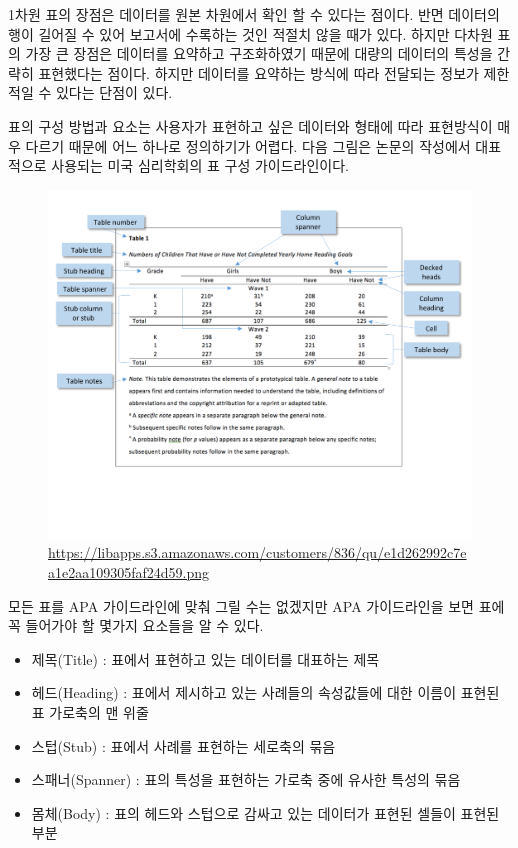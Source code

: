 \documentclass[
]{article}
\begin{document}
1차원 표의 장점은 데이터를 원본 차원에서 확인 할 수 있다는 점이다. 반면
데이터의 행이 길어질 수 있어 보고서에 수록하는 것인 적절치 않을 때가
있다. 하지만 다차원 표의 가장 큰 장점은 데이터를 요약하고 구조화하였기
때문에 대량의 데이터의 특성을 간략히 표현했다는 점이다. 하지만 데이터를
요약하는 방식에 따라 전달되는 정보가 제한적일 수 있다는 단점이 있다.

표의 구성 방법과 요소는 사용자가 표현하고 싶은 데이터와 형태에 따라
표현방식이 매우 다르기 때문에 어느 하나로 정의하기가 어렵다. 다음 그림은
논문의 작성에서 대표적으로 사용되는 미국 심리학회의 표 구성
가이드라인이다.

\begin{figure}
\centering
\includegraphics{apa.png}
\caption{\url{https://libapps.s3.amazonaws.com/customers/836/qu/e1d262992c7ea1e2aa109305faf24d59.png}}
\end{figure}

모든 표를 APA 가이드라인에 맞춰 그릴 수는 없겠지만 APA 가이드라인을 보면
표에 꼭 들어가야 할 몇가지 요소들을 알 수 있다.

\begin{itemize}
\item
  제목(Title) : 표에서 표현하고 있는 데이터를 대표하는 제목
\item
  헤드(Heading) : 표에서 제시하고 있는 사례들의 속성값들에 대한 이름이
  표현된 표 가로축의 맨 위줄
\item
  스텁(Stub) : 표에서 사례를 표현하는 세로축의 묶음
\item
  스패너(Spanner) : 표의 특성을 표현하는 가로축 중에 유사한 특성의 묶음
\item
  몸체(Body) : 표의 헤드와 스텁으로 감싸고 있는 데이터가 표현된 셀들이
  표현된 부분
\end{itemize}
\end{document}
